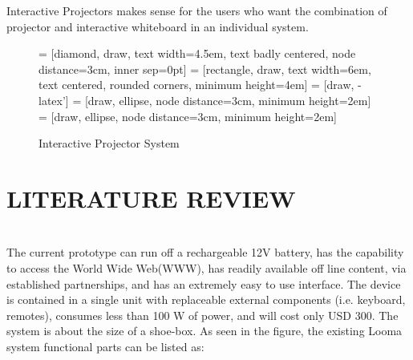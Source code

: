 \documentclass[12pt, a4paper]{article}
\begin{document}
Interactive Projectors makes sense for the
users who want the combination of projector and interactive whiteboard in
an individual system. 

\begin{figure} 
\centering
{} = [diamond, draw, text width=4.5em, text badly centered, node distance=3cm, inner sep=0pt]
 = [rectangle, draw, text width=6em, text centered, rounded corners, minimum height=4em]
 = [draw, -latex']
 = [draw, ellipse, node distance=3cm,
    minimum height=2em]
 = [draw, ellipse, node distance=3cm,
    minimum height=2em]
    
\caption{Interactive Projector System}\label{}
\end{figure}
\newpage
\section{LITERATURE REVIEW}
~\\
The current prototype can run off a rechargeable 12V battery, has the capability to access the World Wide Web(WWW), has readily available off line content, via established partnerships, and has an extremely easy to use interface. The device is contained in a single unit with replaceable external components (i.e. keyboard, remotes), consumes less than 100 W of power, and will cost only USD 300. The system is about the size of a shoe-box. 
As seen in the figure, the existing Looma system functional parts can be listed as:
\end{document}
